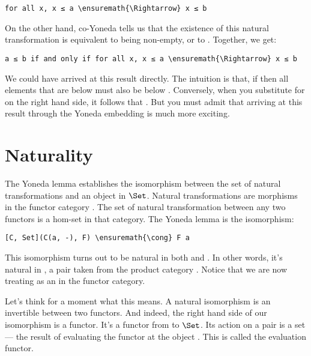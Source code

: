 \begin{Verbatim}[commandchars=\\\{\}]
for all x, x ≤ a \ensuremath{\Rightarrow} x ≤ b
\end{Verbatim}
On the other hand, co-Yoneda tells us that the existence of this natural
transformation is equivalent to  being non-empty, or to
. Together, we get:

\begin{Verbatim}[commandchars=\\\{\}]
a ≤ b if and only if for all x, x ≤ a \ensuremath{\Rightarrow} x ≤ b
\end{Verbatim}
We could have arrived at this result directly. The intuition is that, if
 then all elements that are below 
must also be below . Conversely, when you substitute
 for  on the right hand side, it follows that
. But you must admit that arriving at this
result through the Yoneda embedding is much more exciting.

\section{Naturality}\label{naturality}

The Yoneda lemma establishes the isomorphism between the set of natural
transformations and an object in $\Set$. Natural transformations
are morphisms in the functor category \code{{[}C, Set{]}}. The set of
natural transformation between any two functors is a hom-set in that
category. The Yoneda lemma is the isomorphism:

\begin{Verbatim}[commandchars=\\\{\}]
[C, Set](C(a, -), F) \ensuremath{\cong} F a
\end{Verbatim}
This isomorphism turns out to be natural in both  and
. In other words, it's natural in , a pair
taken from the product category . Notice
that we are now treating  as an  in the functor
category.

Let's think for a moment what this means. A natural isomorphism is an
invertible  between two functors. And
indeed, the right hand side of our isomorphism is a functor. It's a
functor from  to $\Set$. Its action on
a pair  is a set --- the result of evaluating the
functor  at the object . This is called the
evaluation functor.

